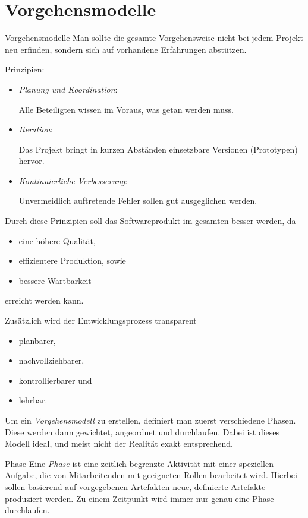\section{Vorgehensmodelle}

\begin{defi}{Vorgehensmodelle}
    Man sollte die gesamte Vorgehensweise nicht bei jedem Projekt neu erfinden, sondern sich auf vorhandene Erfahrungen abstützen.

    Prinzipien:
    \begin{itemize}
        \item \emph{Planung und Koordination}:

              Alle Beteiligten wissen im Voraus, was getan werden muss.
        \item \emph{Iteration}:

              Das Projekt bringt in kurzen Abständen einsetzbare Versionen (Prototypen) hervor.
        \item \emph{Kontinuierliche Verbesserung}:

              Unvermeidlich auftretende Fehler sollen gut ausgeglichen werden.
    \end{itemize}

    Durch diese Prinzipien soll das Softwareprodukt im gesamten besser werden, da
    \begin{itemize}
        \item eine höhere Qualität,
        \item effizientere Produktion, sowie
        \item bessere Wartbarkeit
    \end{itemize}
    erreicht werden kann.

    Zusätzlich wird der Entwicklungsprozess transparent
    \begin{itemize}
        \item planbarer,
        \item nachvollziehbarer,
        \item kontrollierbarer und
        \item lehrbar.
    \end{itemize}

    Um ein \emph{Vorgehensmodell} zu erstellen, definiert man zuerst verschiedene Phasen.
    Diese werden dann gewichtet, angeordnet und durchlaufen.
    Dabei ist dieses Modell ideal, und meist nicht der Realität exakt entsprechend.
\end{defi}

\begin{defi}{Phase}
    Eine \emph{Phase} ist eine zeitlich begrenzte Aktivität mit einer speziellen Aufgabe, die von Mitarbeitenden mit geeigneten Rollen bearbeitet wird.
    Hierbei sollen basierend auf vorgegebenen Artefakten neue, definierte Artefakte produziert werden.
    Zu einem Zeitpunkt wird immer nur genau eine Phase durchlaufen.
\end{defi}

